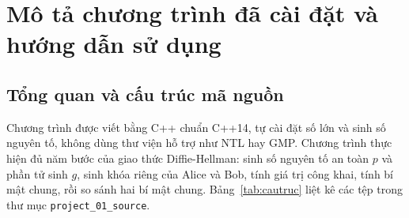 
\section{Mô tả chương trình đã cài đặt và hướng dẫn sử dụng}
\label{sec:mo-ta-chuong-trinh}
\label{sec:chuong-trinh}

\subsection{Tổng quan và cấu trúc mã nguồn}

Chương trình được viết bằng C++ chuẩn C++14, tự cài đặt số lớn và sinh số nguyên
tố, không dùng thư viện hỗ trợ như NTL hay GMP. Chương trình thực hiện đủ năm
bước của giao thức Diffie-Hellman: sinh số nguyên tố an toàn $p$ và phần tử sinh
$g$, sinh khóa riêng của Alice và Bob, tính giá trị công khai, tính bí mật chung,
rồi so sánh hai bí mật chung. Bảng~\ref{tab:cautruc} liệt kê các tệp trong thư mục
\texttt{project\_01\_source}.

